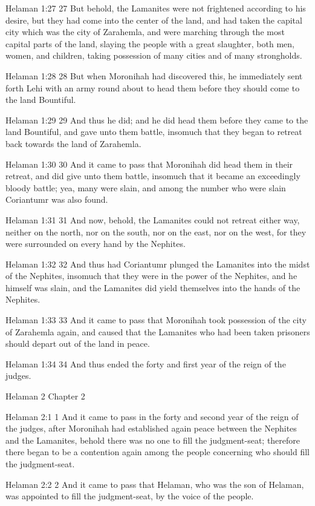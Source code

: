 Helaman 1:27
 27 But behold, the Lamanites were not frightened according to
his desire, but they had come into the center of the land, and
had taken the capital city which was the city of Zarahemla, and
were marching through the most capital parts of the land, slaying
the people with a great slaughter, both men, women, and children,
taking possession of many cities and of many strongholds.

Helaman 1:28
 28 But when Moronihah had discovered this, he immediately sent
forth Lehi with an army round about to head them before they
should come to the land Bountiful.

Helaman 1:29
 29 And thus he did; and he did head them before they came to the
land Bountiful, and gave unto them battle, insomuch that they
began to retreat back towards the land of Zarahemla.

Helaman 1:30
 30 And it came to pass that Moronihah did head them in their
retreat, and did give unto them battle, insomuch that it became
an exceedingly bloody battle; yea, many were slain, and among the
number who were slain Coriantumr was also found.

Helaman 1:31
 31 And now, behold, the Lamanites could not retreat either way,
neither on the north, nor on the south, nor on the east, nor on
the west, for they were surrounded on every hand by the Nephites.

Helaman 1:32
 32 And thus had Coriantumr plunged the Lamanites into the midst
of the Nephites, insomuch that they were in the power of the
Nephites, and he himself was slain, and the Lamanites did yield
themselves into the hands of the Nephites.

Helaman 1:33
 33 And it came to pass that Moronihah took possession of the
city of Zarahemla again, and caused that the Lamanites who had
been taken prisoners should depart out of the land in peace.

Helaman 1:34
 34 And thus ended the forty and first year of the reign of the
judges.

Helaman 2
Chapter 2

Helaman 2:1
 1 And it came to pass in the forty and second year of the reign
of the judges, after Moronihah had established again peace
between the Nephites and the Lamanites, behold there was no one
to fill the judgment-seat; therefore there began to be a
contention again among the people concerning who should fill the
judgment-seat.

Helaman 2:2
 2 And it came to pass that Helaman, who was the son of Helaman,
was appointed to fill the judgment-seat, by the voice of the
people.

